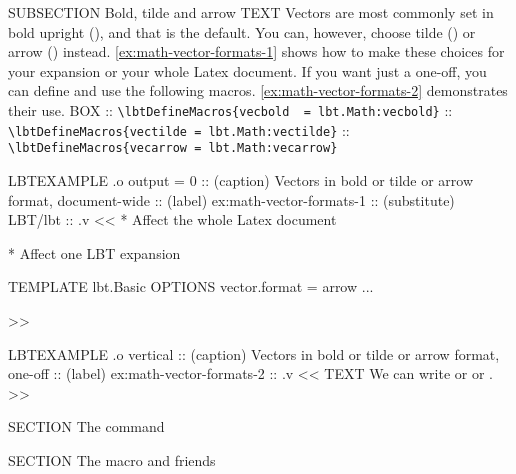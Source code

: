 \begin{lbt}
    SUBSECTION Bold, tilde and arrow
    TEXT Vectors are most commonly set in bold upright (), and that is the \lbtlogo{} default. You can, however, choose tilde () or arrow () instead. \cref{ex:math-vector-formats-1} shows how to make these choices for your \lbtlogo{} expansion or your whole Latex document. If you want just a one-off, you can define and use the following macros. \cref{ex:math-vector-formats-2} demonstrates their use.
    BOX
    :: \verb|\lbtDefineMacros{vecbold  = lbt.Math:vecbold}|
    :: \verb|\lbtDefineMacros{vectilde = lbt.Math:vectilde}|
    :: \verb|\lbtDefineMacros{vecarrow = lbt.Math:vecarrow}|

    LBTEXAMPLE .o output = 0
    :: (caption) Vectors in bold or tilde or arrow format, document-wide
    :: (label) ex:math-vector-formats-1
    :: (substitute) LBT/lbt
    :: .v <<
      * Affect the whole Latex document

      * Affect one LBT expansion
      \begin{LBT}
        [@META]
          TEMPLATE lbt.Basic
          OPTIONS  vector.format = arrow
        ...
      \end{LBT}
    >>

    LBTEXAMPLE .o vertical
    :: (caption) Vectors in bold or tilde or arrow format, one-off
    :: (label) ex:math-vector-formats-2
    :: .v <<
      TEXT We can write  or  or .
    >>



    SECTION The  command

    SECTION The  macro and friends

\end{lbt}
